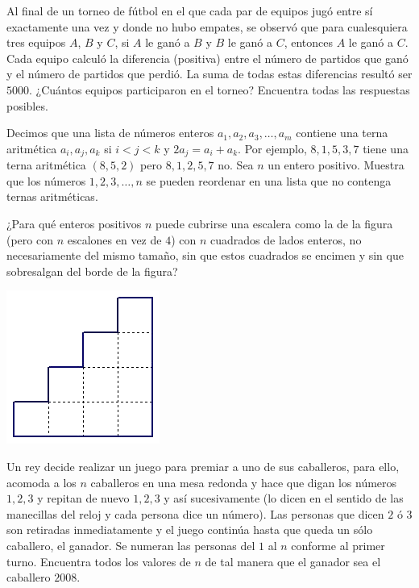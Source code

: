 \documentclass[11pt]{scrartcl}
\begin{document}
\begin{problem}
    [2004/4]
    Al final de un torneo de fútbol en el que cada par de equipos jugó entre sí exactamente una vez y donde no hubo empates, se observó que para cualesquiera tres equipos $A$, $B$ y $C$, si $A$ le ganó a $B$ y $B$ le ganó a $C$, entonces $A$ le ganó a $C$. 
Cada equipo calculó la diferencia (positiva) entre el número de partidos que ganó y el número de partidos que perdió. La suma de todas estas diferencias resultó ser $5000$. ¿Cuántos equipos participaron en el torneo? Encuentra todas las respuestas posibles.
\end{problem}
\begin{problem}
    [2005/4]
    Decimos que una lista de números enteros $a_1,a_2,a_3,\dots ,a_m$ contiene una terna aritmética $a_i,a_j,a_k$ si $i< j< k$ y $2a_j=a_i+a_k$. Por ejemplo, $8,1,5,3,7$ tiene una terna aritmética $(8,5,2)$ pero $8,1,2,5,7$ no. Sea $n$ un entero positivo. Muestra que los números $1,2,3,\dots ,n$ se pueden reordenar en una lista que no contenga ternas aritméticas.
\end{problem}
\begin{problem}
    [2006/4]
    ¿Para qué enteros positivos $n$ puede cubrirse una escalera como la de la figura (pero con $n$ escalones en vez de $4$) con $n$ cuadrados de lados enteros, no necesariamente del mismo tamaño, sin que estos cuadrados se encimen y sin que sobresalgan del borde de la figura?
    \begin{center}
    \includegraphics[scale=0.4]{06OMM4.png}
    \end{center}
\end{problem}
\begin{problem}
    [2008/4]
    Un rey decide realizar un juego para premiar a uno de sus caballeros, para ello, acomoda
a los $n$ caballeros en una mesa redonda y hace que digan los números $1, 2, 3$ y repitan de
nuevo $1, 2, 3$ y así sucesivamente (lo dicen en el sentido de las manecillas del reloj y cada
persona dice un número). Las personas que dicen $2$ ó $3$ son retiradas inmediatamente y
el juego continúa hasta que queda un sólo caballero, el ganador. Se numeran las personas
del $1$ al $n$ conforme al primer turno.
Encuentra todos los valores de $n$ de tal manera que el ganador sea el caballero $2008$.
\end{problem}
\end{document}
